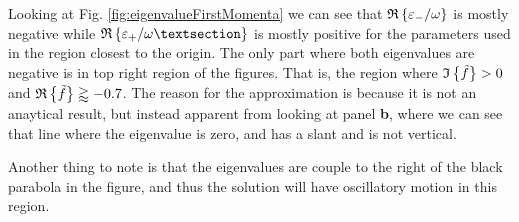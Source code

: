 Looking at Fig. \ref{fig:eigenvalueFirstMomenta} we can see that $\mathfrak{R}\left\{\varepsilon_- / \omega\right\}$ is mostly negative while $\re{\varepsilon_+ / \omega§}$ is mostly positive for the parameters used in the region closest to the origin. The only part where both eigenvalues are negative is in top right region of the figures. That is, the region where $\mathfrak{I}\left\{\tilde{f}\right\} > 0$ and $\mathfrak{R}\left\{\tilde{f}\right\} \gtrapprox -0.7$. The reason for the approximation is because it is not an anaytical result, but instead apparent from looking at panel \textbf{b}, where we can see that line where the eigenvalue is zero, and has a slant and is not vertical.



Another thing to note is that the eigenvalues are couple to the right of the black parabola in the figure, and thus the solution will have oscillatory motion in this region.


